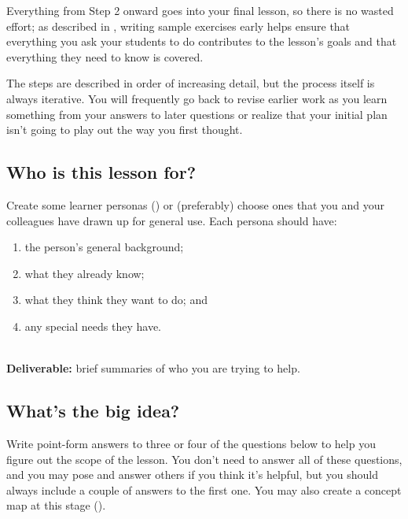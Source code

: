 Everything from Step 2 onward goes into your final lesson,
so there is no wasted effort;
as described in ,
writing sample exercises early helps ensure that
everything you ask your students to do contributes to the lesson's goals
and that everything they need to know is covered.

The steps are described in order of increasing detail,
but the process itself is always iterative.
You will frequently go back to revise earlier work
as you learn something from your answers to later questions
or realize that your initial plan isn't going to play out the way you first thought.

\subsection*{Who is this lesson for?}

Create some learner personas ()
or (preferably) choose ones that you and your colleagues have drawn up for general use.
Each persona should have:

\begin{enumerate}

\item
  the person's general background;

\item
  what they already know;

\item
  what they think they want to do; and

\item
  any special needs they have.

\end{enumerate}

~\\
\noindent
\textbf{Deliverable:} brief summaries of who you are trying to help.

\subsection*{What's the big idea?}

Write point-form answers to three or four of the questions below
to help you figure out the scope of the lesson.
You don't need to answer all of these questions,
and you may pose and answer others if you think it's helpful,
but you should always include a couple of answers to the first one.
You may also create a concept map at this stage ().


